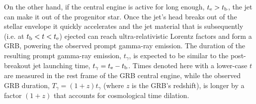 \documentclass[useAMS,usenatbib]{mn2e}
\begin{document}
On the other hand, if the central engine is active for long enough, $t_{\rm e}>t_{\rm b}$, the jet can make it out of the progenitor star.
Once the jet's head breaks out of the stellar envelope it quickly accelerates and the jet material that is subsequently (i.e. at $t_{\rm b}<t<t_{\rm e}$) ejected can reach ultra-relativistic Lorentz factors and form a GRB, powering the observed prompt gamma-ray emission. The duration of the resulting prompt gamma-ray emission, $t_\gamma$, is expected to be similar to the post-breakout jet launching time, $t_\gamma=t_{\rm e}-t_{\rm b}$. Times denoted here with a lower-case $t$ are measured in the rest frame of the GRB central engine, while the observed GRB duration, $T_\gamma=(1+z)t_\gamma$ (where $z$ is the GRB's redshift), is longer by a factor $(1+z)$ that accounts for cosmological time dilation.
\end{document}
